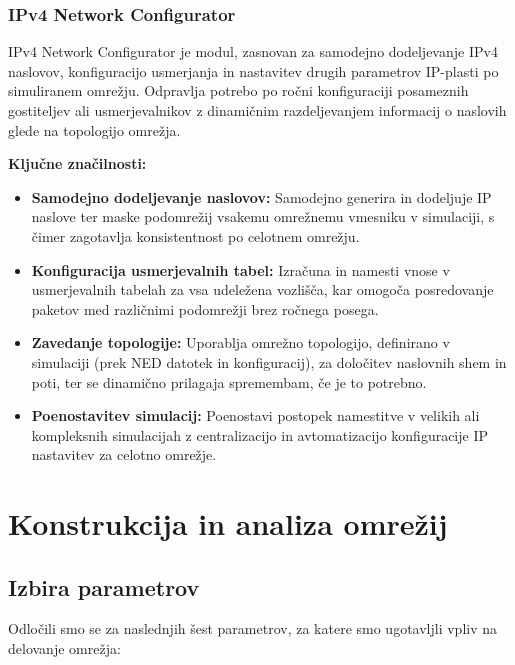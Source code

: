 \subsubsection{IPv4 Network Configurator}
IPv4 Network Configurator je modul, zasnovan za samodejno dodeljevanje IPv4 naslovov, konfiguracijo usmerjanja in nastavitev drugih parametrov IP-plasti po simuliranem omrežju. Odpravlja potrebo po ročni konfiguraciji posameznih gostiteljev ali usmerjevalnikov z dinamičnim razdeljevanjem informacij o naslovih glede na topologijo omrežja.

\vspace{1em}

\noindent\begin{minipage}{\linewidth}
    \textbf{Ključne značilnosti:}
    \begin{itemize}
        \item \textbf{Samodejno dodeljevanje naslovov:} Samodejno generira in dodeljuje IP naslove ter maske podomrežij vsakemu omrežnemu vmesniku v simulaciji, s čimer zagotavlja konsistentnost po celotnem omrežju.
        \item \textbf{Konfiguracija usmerjevalnih tabel:} Izračuna in namesti vnose v usmerjevalnih tabelah za vsa udeležena vozlišča, kar omogoča posredovanje paketov med različnimi podomrežji brez ročnega posega.
        \item \textbf{Zavedanje topologije:} Uporablja omrežno topologijo, definirano v simulaciji (prek NED datotek in konfiguracij), za določitev naslovnih shem in poti, ter se dinamično prilagaja spremembam, če je to potrebno.
        \item \textbf{Poenostavitev simulacij:} Poenostavi postopek namestitve v velikih ali kompleksnih simulacijah z centralizacijo in avtomatizacijo konfiguracije IP nastavitev za celotno omrežje.
    \end{itemize}
\end{minipage}

\section{Konstrukcija in analiza omrežij}

\subsection{Izbira parametrov}

Odločili smo se za naslednjih šest parametrov, za katere smo ugotavljli vpliv na delovanje omrežja:

